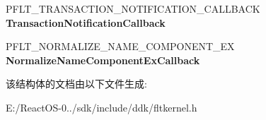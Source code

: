 \begin{DoxyCompactItemize}
\item 
\mbox{\label{struct___f_l_t___r_e_g_i_s_t_r_a_t_i_o_n_ac07eb4996fbd42685d4e7ff04ae78d82}} 
P\+F\+L\+T\+\_\+\+T\+R\+A\+N\+S\+A\+C\+T\+I\+O\+N\+\_\+\+N\+O\+T\+I\+F\+I\+C\+A\+T\+I\+O\+N\+\_\+\+C\+A\+L\+L\+B\+A\+CK {\bfseries Transaction\+Notification\+Callback}
\item 
\mbox{\label{struct___f_l_t___r_e_g_i_s_t_r_a_t_i_o_n_a528f6409007e3506517014b8f2ce9b77}} 
P\+F\+L\+T\+\_\+\+N\+O\+R\+M\+A\+L\+I\+Z\+E\+\_\+\+N\+A\+M\+E\+\_\+\+C\+O\+M\+P\+O\+N\+E\+N\+T\+\_\+\+EX {\bfseries Normalize\+Name\+Component\+Ex\+Callback}
\end{DoxyCompactItemize}


该结构体的文档由以下文件生成\+:\begin{DoxyCompactItemize}
\item 
E\+:/\+React\+O\+S-\/0../sdk/include/ddk/fltkernel.\+h\end{DoxyCompactItemize}
